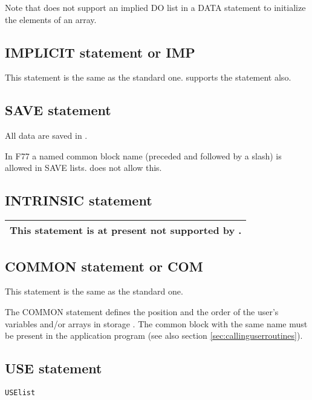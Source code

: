 Note that \COMIS{} does not support an implied DO list in a DATA
statement to initialize the elements of an array.

\subsection*{IMPLICIT statement or IMP}
 
This statement is the same as the standard one.
\COMIS{} supports the  statement also.
 
\subsection*{SAVE statement}

All data are saved in \COMIS{} .

In F77 a named common block name (preceded and followed
by a slash) is allowed in SAVE lists. \COMIS{} does not allow this.
 
\subsection*{INTRINSIC statement}

\begin{tabular}{|c|}\hline
This statement is at present not supported by \COMIS{}.\\\hline
\end{tabular}
 
\subsection*{COMMON statement or COM}
 
This statement is the same as the standard one.
 
The COMMON statement defines the position and the order of the user's
variables and/or arrays in storage . The common block with the same
name must be present in the application program (see also section
\ref{sec:callinguserroutines}).
 
\subsection*{USE statement}

\begin{alltt}
 USE list
\end{alltt}
 
